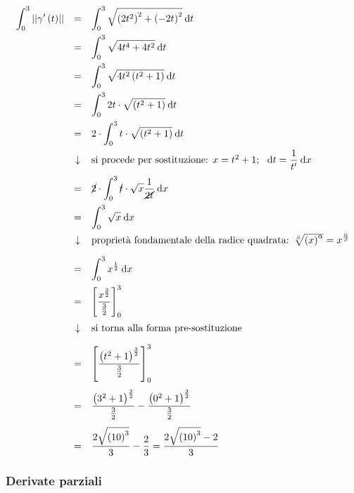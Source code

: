 \documentclass[a4paper]{article}
\begin{document}
	\begin{equation*}
		\begin{array}{rcl}
			\displaystyle\int_{0}^{3} \left|\left| \gamma'\left(t\right) \right|\right| 
			&=& 
			\displaystyle\int_{0}^{3} \sqrt{\left(2t^{2}\right)^{2} + \left(-2t\right)^{2}} \:\mathrm{d}t \\ [1em]
			&=& \displaystyle\int_{0}^{3} \sqrt{4t^{4} + 4t^{2}} \:\mathrm{d}t \\ [1em]
			&=& \displaystyle\int_{0}^{3} \sqrt{4t^{2}\left(t^{2} + 1\right)} \:\mathrm{d}t \\ [1em]
			&=& \displaystyle\int_{0}^{3} 2t \cdot \sqrt{\left(t^{2} + 1\right)} \:\mathrm{d}t \\ [1em]
			&=& 2 \cdot \displaystyle\int_{0}^{3} t \cdot \sqrt{\left(t^{2} + 1\right)} \:\mathrm{d}t \\ [1em]
			&\downarrow& \text{si procede per sostituzione: }x = t^{2} + 1; \:\:\: \mathrm{d}t = \dfrac{1}{t'} \:\mathrm{d}x \\ [1em]
			&=& \cancel{2} \cdot \displaystyle\int_{0}^{3} \cancel{t} \cdot \sqrt{x} \dfrac{1}{\cancel{2t}} \:\mathrm{d}x \\ [1em]
			&=& \displaystyle\int_{0}^{3} \sqrt{x} \:\mathrm{d}x \\ [1em]
			&\downarrow& \text{proprietà fondamentale della radice quadrata: }\sqrt[\beta]{\left(x\right)^{\alpha}} = x^{\frac{\alpha}{\beta}} \\ [1em]
			&=& \displaystyle\int_{0}^{3} x^{\frac{1}{2}} \:\mathrm{d}x \\ [1em]
			&=& \left[\dfrac{x^{\frac{3}{2}}}{\frac{3}{2}}\right]_{0}^{3} \\ [1.5em]
			&\downarrow& \text{si torna alla forma pre-sostituzione} \\ [1em]
			&=& \left[\dfrac{\left(t^{2}+1\right)^{\frac{3}{2}}}{\frac{3}{2}}\right]_{0}^{3} \\ [2em]
			&=& \dfrac{\left(3^{2}+1\right)^{\frac{3}{2}}}{\frac{3}{2}} - \dfrac{\left(0^{2}+1\right)^{\frac{3}{2}}}{\frac{3}{2}} \\ [1.5em]
			&=& \dfrac{2\sqrt{\left(10\right)^{3}}}{3} - \dfrac{2}{3} = \dfrac{2\sqrt{\left(10\right)^{3}} - 2}{3}
		\end{array}
	\end{equation*}\newpage

	\subsubsection{Derivate parziali}\label{subsubsection: derivate parziali}
\end{document}
